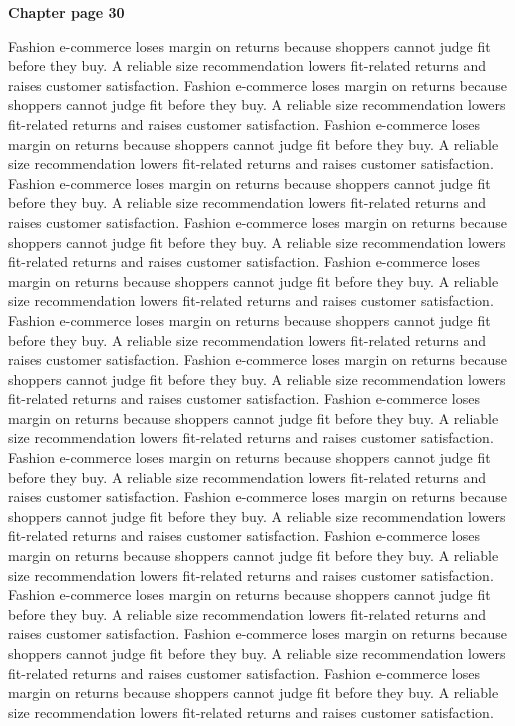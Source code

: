 \documentclass[a4paper,11pt]{article}
\begin{document}
{\headfont\bfseries\Large Chapter page 30}\par\medskip
Fashion e-commerce loses margin on returns because shoppers cannot judge fit before they buy. A reliable size recommendation lowers fit-related returns and raises customer satisfaction. Fashion e-commerce loses margin on returns because shoppers cannot judge fit before they buy. A reliable size recommendation lowers fit-related returns and raises customer satisfaction. Fashion e-commerce loses margin on returns because shoppers cannot judge fit before they buy. A reliable size recommendation lowers fit-related returns and raises customer satisfaction. Fashion e-commerce loses margin on returns because shoppers cannot judge fit before they buy. A reliable size recommendation lowers fit-related returns and raises customer satisfaction. Fashion e-commerce loses margin on returns because shoppers cannot judge fit before they buy. A reliable size recommendation lowers fit-related returns and raises customer satisfaction. 
Fashion e-commerce loses margin on returns because shoppers cannot judge fit before they buy. A reliable size recommendation lowers fit-related returns and raises customer satisfaction. Fashion e-commerce loses margin on returns because shoppers cannot judge fit before they buy. A reliable size recommendation lowers fit-related returns and raises customer satisfaction. Fashion e-commerce loses margin on returns because shoppers cannot judge fit before they buy. A reliable size recommendation lowers fit-related returns and raises customer satisfaction. Fashion e-commerce loses margin on returns because shoppers cannot judge fit before they buy. A reliable size recommendation lowers fit-related returns and raises customer satisfaction. Fashion e-commerce loses margin on returns because shoppers cannot judge fit before they buy. A reliable size recommendation lowers fit-related returns and raises customer satisfaction. 
Fashion e-commerce loses margin on returns because shoppers cannot judge fit before they buy. A reliable size recommendation lowers fit-related returns and raises customer satisfaction. Fashion e-commerce loses margin on returns because shoppers cannot judge fit before they buy. A reliable size recommendation lowers fit-related returns and raises customer satisfaction. Fashion e-commerce loses margin on returns because shoppers cannot judge fit before they buy. A reliable size recommendation lowers fit-related returns and raises customer satisfaction. Fashion e-commerce loses margin on returns because shoppers cannot judge fit before they buy. A reliable size recommendation lowers fit-related returns and raises customer satisfaction. Fashion e-commerce loses margin on returns because shoppers cannot judge fit before they buy. A reliable size recommendation lowers fit-related returns and raises customer satisfaction. \newpage
\end{document}

